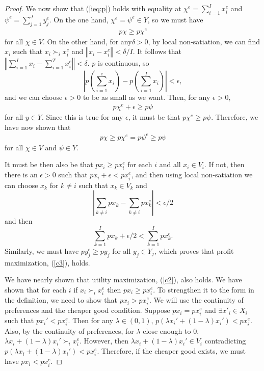 \documentclass[12pt,reqno]{amsart}
\theoremstyle{definition}
\newcommand{\norm}[1]{\left\Vert {#1} \right\Vert}
\newcommand{\pref}{\succ}
\begin{document}
\begin{proof}
  We now show that (\ref{ieq:p}) holds with equality at $\chi^e =
  \sum_{i=1}^I x_i^e$ and $\psi^e = \sum_{j=1}^J y_j^e$. On the
  one hand, $\chi^e = \psi^e \in Y$, so we must have 
  \begin{align*}
    p \chi \geq p \chi^e 
  \end{align*}
  for all $\chi \in V$. On the other hand, for any$\delta > 0$, by
  local non-satiation, we can find $x_i$ such that $x_i \pref_i x_i^e$
  and $\norm{x_i - x_i^e}<\delta/I$. It follows that
  $\norm{\sum_{i=1}^I x_i - \sum_{i=1}^T x_i^e } < \delta$. $p$ is
  continuous, so
  \[
  \left\vert p\left( \sum_{i=1}^e x_i \right) - p\left(\sum_{i=1}^I
      x_i\right) \right\vert < \epsilon,
  \]
  and we can choose $\epsilon>0$ to be as small as we want. 
  Then, for any $\epsilon >0$, 
  \begin{align*}
    p \chi^e + \epsilon \geq p \psi
  \end{align*}
  for all $y \in Y$. Since this is true for any $\epsilon$, it must be
  that $p \chi^e \geq p \psi$. Therefore, we have now shown
  that
  \begin{align}
    p\chi \geq p \chi^e = p \psi^e \geq p \psi
  \end{align}  
  for all $\chi \in V$ and $\psi \in Y$. 

  It must be then also be that $p x_i \geq p x_i^e $ for each $i$ and
  all $x_i \in V_i$. If not, then there is an $\epsilon>0$ such that
  $p x_i + \epsilon < p x_i^e$, and then using local non-satiation we
  can choose $x_k$ for $k\neq i$ such that $x_k \in V_k$ and 
  \[\left| \sum_{
      k \neq i } px_k - \sum_{k \neq i } p x_k^e \right| < \epsilon/2
  \]
  and then 
  \[ \sum_{k=1}^I p x_k + \epsilon/2 < \sum_{k=1}^I p x_k^e. \]
  Similarly, we must have $p y_j^e \geq p y_j$ for all $y_j \in Y_j$,
  which proves that profit maximization, (\ref{c3}), holds. 

  We have nearly shown that utility maximization, (\ref{c2}), also
  holds. We have shown that for each $i$ if $x_i \pref_i x_i^e$ then
  $p x_i \geq p x_i^e$. To strengthen it to the form in the
  definition, we need to show that $px_i > p x_i^e$. We will use the
  continuity of preferences and the cheaper good condition. Suppose $p
  x_i = p x_i^e$ and $\exists x'_i \in X_i$ such that $p x_i' < p
  x_i^e$. Then for any $\lambda \in (0,1)$, $p(\lambda x_i'
  +(1-\lambda) x_i') < p x_i^e$. Also, by the continuity of
  preferences, for $\lambda$ close enough to $0$, $\lambda x_i +
  (1-\lambda)x_i' \pref_i x_i^e$. However, then $\lambda x_i +
  (1-\lambda) x_i' \in V_i$ contradicting $p(\lambda x_i
  +(1-\lambda) x_i') < p x_i^e$. Therefore, if the cheaper good
  exists, we must have $p x_i < p x_i^e$.   
\end{proof}
\end{document}
